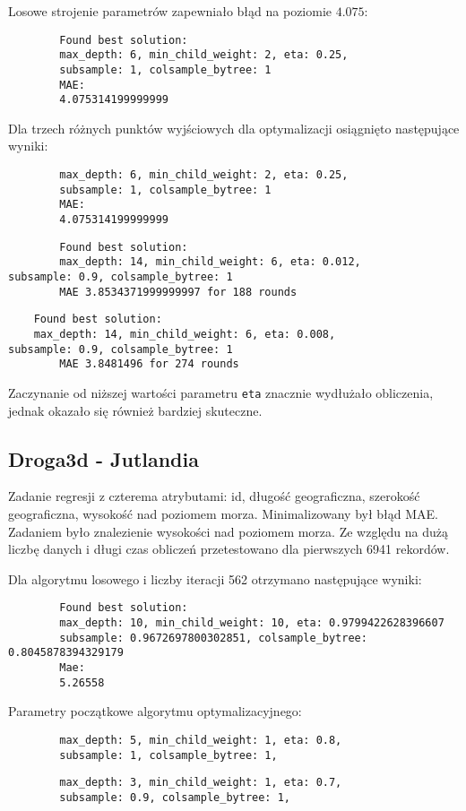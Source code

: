 \documentclass[a4paper,12p]{article}
\begin{document}
	Losowe strojenie parametrów zapewniało błąd na poziomie $4.075$:
	
	\begin{verbatim}
		Found best solution:
		max_depth: 6, min_child_weight: 2, eta: 0.25,
		subsample: 1, colsample_bytree: 1
		MAE:	
		4.075314199999999
	\end{verbatim}
	
	Dla trzech różnych punktów wyjściowych dla optymalizacji osiągnięto następujące wyniki:
	
	\begin{verbatim}
		max_depth: 6, min_child_weight: 2, eta: 0.25,
		subsample: 1, colsample_bytree: 1
		MAE:	
		4.075314199999999
	\end{verbatim}
	
	\begin{verbatim}
		Found best solution:
		max_depth: 14, min_child_weight: 6, eta: 0.012,
subsample: 0.9, colsample_bytree: 1
        MAE 3.8534371999999997 for 188 rounds
	\end{verbatim}
	
	\begin{verbatim}
	Found best solution:
	max_depth: 14, min_child_weight: 6, eta: 0.008,
subsample: 0.9, colsample_bytree: 1
        MAE 3.8481496 for 274 rounds
	\end{verbatim}
	
	Zaczynanie od niższej wartości parametru \texttt{eta} znacznie wydłużało obliczenia, jednak okazało się również bardziej skuteczne.
	
	\subsection{Droga3d - Jutlandia}
	Zadanie regresji z czterema atrybutami: id, długość geograficzna, szerokość geograficzna, wysokość nad poziomem morza. Minimalizowany był błąd MAE. Zadaniem było znalezienie wysokości nad poziomem morza. Ze względu na dużą liczbę danych i długi czas obliczeń przetestowano dla pierwszych 6941 rekordów.
	
	
	Dla algorytmu losowego i liczby iteracji 562 otrzymano następujące wyniki: 
	
	\begin{verbatim} 
		Found best solution:
		max_depth: 10, min_child_weight: 10, eta: 0.9799422628396607 
		subsample: 0.9672697800302851, colsample_bytree: 0.8045878394329179
		Mae: 
		5.26558
	\end{verbatim}
	
	Parametry początkowe algorytmu optymalizacyjnego:
	\begin{verbatim}
		max_depth: 5, min_child_weight: 1, eta: 0.8,
		subsample: 1, colsample_bytree: 1,
	\end{verbatim}
	\begin{verbatim}
		max_depth: 3, min_child_weight: 1, eta: 0.7,
		subsample: 0.9, colsample_bytree: 1,
	\end{verbatim}
	
\end{document}
